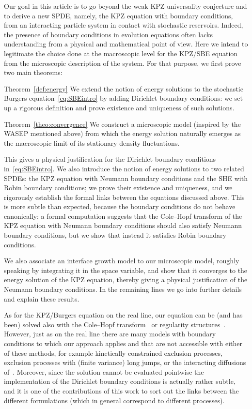 \documentclass[10pt]{amsart}
\theoremstyle{definition}\newtheorem{defi}[theo]{Definition}\newtheorem{rema}[theo]{Remark}\newtheorem{exam}[theo]{Example}\newtheorem{exem}[theo]{Example}\newtheorem{nota}[theo]{Notation}
\begin{document}
Our goal in this article is to go beyond the weak KPZ universality conjecture and to derive a new SPDE, namely, the KPZ equation with boundary conditions, from an interacting particle system in contact with stochastic reservoirs. Indeed, the presence of boundary conditions in evolution equations often lacks understanding from a physical and mathematical point of view. Here we intend to legitimate the choice done at the macroscopic level for the KPZ/SBE equation from the microscopic description of the system. For that purpose, we first prove two main theorems:

\begin{enonce*}{Theorem~\ref{def:energy}}
We extend the notion of energy solutions to the stochastic Burgers equation~\eqref{eq:SBEintro} by adding Dirichlet boundary conditions: we set up a rigorous definition and prove existence and uniqueness of such solutions.
\end{enonce*}

\begin{enonce*}{Theorem~\ref{theo:convergence}}
We construct a microscopic model (inspired by the WASEP mentioned above) from which the energy solution naturally emerges as the macroscopic limit of its stationary density fluctuations.
\end{enonce*}

This gives a physical justification for the Dirichlet boundary conditions in~\eqref{eq:SBEintro}. We also introduce the notion of energy solutions to two related SPDEs: the KPZ equation with Neumann boundary conditions and the SHE with Robin boundary conditions; we prove their existence and uniqueness, and we rigorously establish the formal links between the equations discussed above. This is more subtle than expected, because the boundary conditions do not behave canonically: a formal computation suggests that the Cole--Hopf transform of the KPZ equation with Neumann boundary conditions should also satisfy Neumann boundary conditions, but we show that instead it satisfies Robin boundary conditions.

We also associate an interface growth model to our microscopic model, roughly speaking by integrating it in the space variable, and show that it converges to the energy solution of the KPZ equation, thereby giving a physical justification of the Neumann boundary conditions. In the remaining lines we go into further details and explain these results.

As for the KPZ/Burgers equation on the real line, our equation can be (and has been) solved also with the Cole--Hopf transform~\cite{Corwin2016,Parekh2017} or regularity structures~\cite{Gerencser2018}. However, just as on the real line there are many models with boundary conditions to which our approach applies and that are not accessible with either of these methods, for example kinetically constrained exclusion processes, exclusion processes with (finite variance) long jumps, or the interacting diffusions of~\cite{Diehl2017}. Moreover, since the solution cannot be evaluated pointwise the implementation of the Dirichlet boundary conditions is actually rather subtle, and it is one of the contributions of this work to sort out the links between the different formulations (which in general correspond to different processes).
\end{document}
